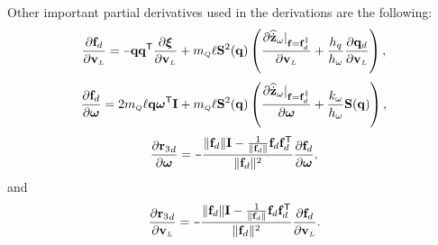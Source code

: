 \documentclass[journal,onecolumn]{IEEEtran}
\newcommand{\minus}{\scalebox{0.75}[1.0]{$-$}}
\begin{document}
	Other important partial derivatives used in the derivations are the following:
	\begin{equation}
		\frac{\partial\fd}{\partial\vL} = \minus\dir\dir[T]\frac{\partial\Xiq}{\partial\vL} + \mQ\ellp\Skew[2]{\dir}\left(\frac{\partial\zwdothat|_{\f=\fd^{\|}}}{\partial\vL} + \frac{h_q}{h_{\omega}}\frac{\partial\dird}{\partial\vL}\right),
	\end{equation}
	\begin{equation}
		\frac{\partial\fd}{\partial\wL}=2\mQ\ellp\dir\wL[T]{\bf I}+\mQ\ellp\Skew[2]{\dir}
	\LP\frac{\partial\zwdothat|_{\f=\fd^{\|}}}{\partial\wL}+\frac{k_{\omega}}{h_{\omega}}\Skew{\dir}\RP,
	\end{equation}
	\begin{equation}
		\frac{\partial\rzd}{\partial\wL} = \minus\frac{\|\fd\|{\bf I} - \frac{1}{\|\fd\|}\fd\fd[T]}{\|\fd\|^2}\frac{\partial\fd}{\partial\wL},
	\end{equation}
	and
	\begin{equation}
		\frac{\partial\rzd}{\partial\vL} = \minus\frac{\|\fd\|{\bf I}-\frac{1}{\|\fd\|}\fd\fd[T]}{\|\fd\|^2}\frac{\partial\fd}{\partial\vL}.
	\end{equation}
	
\end{document}
